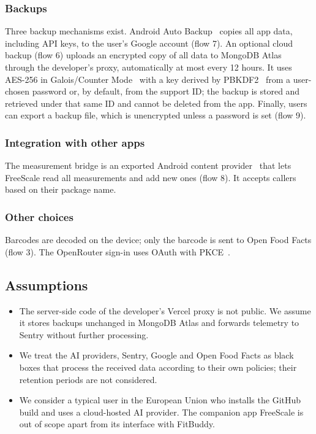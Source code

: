 \documentclass[a4paper,12pt]{article}
\begin{document}
\subsubsection{Backups}
Three backup mechanisms exist. Android Auto Backup~\cite{android-autobackup} copies all app data,
including API keys, to the user's Google account (flow 7). An optional cloud backup (flow 6)
uploads an encrypted copy of all data to MongoDB Atlas through the developer's proxy,
automatically at most every 12 hours. It uses AES-256 in Galois/Counter Mode~\cite{nist-gcm}
with a key derived by PBKDF2~\cite{rfc8018} from a user-chosen password or, by default, from the
support ID; the backup is stored and retrieved under that same ID and cannot be deleted from the
app. Finally, users can export a backup file, which is unencrypted unless a password is set
(flow 9).

\subsubsection{Integration with other apps}
The measurement bridge is an exported Android content provider~\cite{android-contentprovider}
that lets FreeScale read all measurements and add new ones (flow 8). It accepts callers based on
their package name.

\subsubsection{Other choices}
Barcodes are decoded on the device; only the barcode is sent to Open Food Facts (flow 3). The
OpenRouter sign-in uses OAuth with PKCE~\cite{openrouter-oauth,rfc7636}.

\subsection{Assumptions}
\label{sec:assumptions}
\begin{itemize}
  \item The server-side code of the developer's Vercel proxy is not public. We assume it stores
        backups unchanged in MongoDB Atlas and forwards telemetry to Sentry without further
        processing.
  \item We treat the AI providers, Sentry, Google and Open Food Facts as black boxes that process
        the received data according to their own policies; their retention periods are not
        considered.
  \item We consider a typical user in the European Union who installs the GitHub build and uses a
        cloud-hosted AI provider. The companion app FreeScale is out of scope apart from its
        interface with FitBuddy.
\end{itemize}
\end{document}
